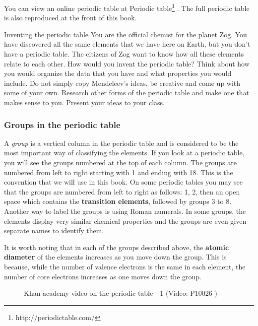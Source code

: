       \label{m38760*eip-773}You can view an online periodic table at Periodic table\footnote{http://periodictable.com/}
        . The full periodic table is also reproduced at the front of this book.\par \label{m38760*eip-400}
\begin{activity}{Inventing the periodic table}
            \nopagebreak
            \label{m38760*eip-603}
You are the official chemist for the planet Zog. You have discovered all the same elements that we have here on Earth, but you don't have a periodic table. The citizens of Zog want to know how all these elements relate to each other. How would you invent the periodic table? Think about how you would organize the data that you have and what properties you would include. Do not simply copy Mendeleev's ideas, be creative and come up with some of your own. Research other forms of the periodic table and make one that makes sense to you. Present your ideas to your class. 
\end{activity}            

\subsubsection{ Groups in the periodic table}
            \nopagebreak
            \label{m38760*id261554}A \textsl{group} is a vertical column in the periodic table and is considered to be the most important way of classifying the elements. If you look at a periodic table, you will see the groups numbered at the top of each column. The groups are numbered from left to right starting with 1 and ending with 18. This is the convention that we will use in this book. On some periodic tables you may see that the groups are numbered from left to right as follows: 1, 2, then an open space which contains the \textbf{transition elements}, followed by groups 3 to 8. Another way to label the groups is using Roman numerals. In some groups, the elements display very similar chemical properties and the groups are even given separate names to identify them.\par 
        \label{m38760*id261833}It is worth noting that in each of the groups described above, the \textbf{atomic diameter} of the elements increases as you move down the group. This is because, while the number of valence electrons is the same in each element, the number of core electrons increases as one moves down the group.\par \label{m38760*eip-148}
    \setcounter{subfigure}{0}
	\begin{figure}[H] %
    \textnormal{Khan academy video on the periodic table - 1}\vspace{.1in} \nopagebreak
  \label{m38760*yt-media1}\label{m38760*yt-video1}
             { (Video:  P10026 )}
      \vspace{2pt}
    \vspace{.1in}
 \end{figure}       \par 
      \label{m38760*uid146}
